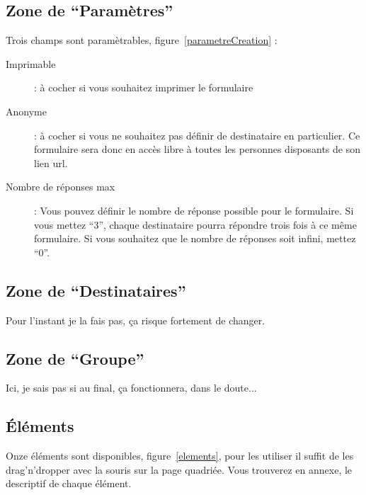 \documentclass[a4paper,11pt,final]{report}
\begin{document}
\subsection{Zone de ``Paramètres''}
Trois champs sont paramètrables, figure~\ref{parametreCreation} :
\begin{description}
	\item [Imprimable] : à cocher si vous souhaitez imprimer le formulaire
	\item [Anonyme] : à cocher si vous ne souhaitez pas définir de destinataire en particulier. Ce formulaire sera donc en accès libre à toutes les personnes disposants de son lien url.
	\item [Nombre de réponses max] : Vous pouvez définir le nombre de réponse possible pour le formulaire. Si vous mettez ``3'', chaque destinataire pourra répondre trois fois à ce même formulaire. Si vous souhaitez que le nombre de réponses soit infini, mettez ``0''.
\end{description}

\noindent\begin{minipage}{\linewidth}%
\label{parametreCreation}
\end{minipage}

\subsection{Zone de ``Destinataires''}
Pour l'instant je la fais pas, ça risque fortement de changer.

\subsection{Zone de ``Groupe''}
Ici, je sais pas si au final, ça fonctionnera, dans le doute...

\subsection{Éléments}
Onze éléments sont disponibles, figure~\ref{elements}, pour les utiliser il suffit de les drag'n'dropper avec la souris sur la page quadriée. Vous trouverez en annexe, le descriptif de chaque élément.
\end{document}
